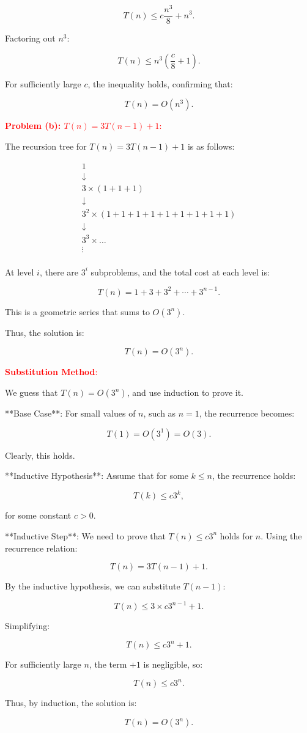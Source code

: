 \documentclass[10pt,letter,notitlepage]{article}
\begin{document}
\begin{Answer}
\[
T(n) \leq c \frac{n^3}{8} + n^3.
\]

Factoring out \( n^3 \):

\[
T(n) \leq n^3 \left( \frac{c}{8} + 1 \right).
\]

For sufficiently large \( c \), the inequality holds, confirming that:

\[
T(n) = O(n^3).
\]

\textcolor{red}{\textbf{Problem (b): \( T(n) = 3T(n-1) + 1 \)}:}

The recursion tree for \( T(n) = 3T(n-1) + 1 \) is as follows:

\[
\begin{array}{c}
1 \\
\downarrow \\
3 \times (1 + 1 + 1) \\
\downarrow \\
3^2 \times (1 + 1 + 1 + 1 + 1 + 1 + 1 + 1 + 1) \\
\downarrow \\
3^3 \times \ldots \\
\vdots \\
\end{array}
\]

At level \( i \), there are \( 3^i \) subproblems, and the total cost at each level is:

\[
T(n) = 1 + 3 + 3^2 + \cdots + 3^{n-1}.
\]

This is a geometric series that sums to \( O(3^n) \).

Thus, the solution is:

\[
T(n) = O(3^n).
\]

\textcolor{red}{\textbf{Substitution Method}:}

We guess that \( T(n) = O(3^n) \), and use induction to prove it.

**Base Case**: For small values of \( n \), such as \( n = 1 \), the recurrence becomes:

\[
T(1) = O(3^1) = O(3).
\]

Clearly, this holds.

**Inductive Hypothesis**: Assume that for some \( k \leq n \), the recurrence holds:

\[
T(k) \leq c 3^k,
\]

for some constant \( c > 0 \).

**Inductive Step**: We need to prove that \( T(n) \leq c 3^n \) holds for \( n \). Using the recurrence relation:

\[
T(n) = 3T(n-1) + 1.
\]

By the inductive hypothesis, we can substitute \( T(n-1) \):

\[
T(n) \leq 3 \times c 3^{n-1} + 1.
\]

Simplifying:

\[
T(n) \leq c 3^n + 1.
\]

For sufficiently large \( n \), the term \( +1 \) is negligible, so:

\[
T(n) \leq c 3^n.
\]

Thus, by induction, the solution is:

\[
T(n) = O(3^n).
\]


\end{Answer}
\end{document}
